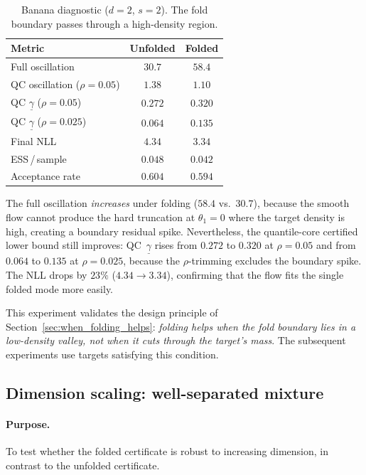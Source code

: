 \begin{table}[t]
\centering
\caption{Banana diagnostic ($d = 2$, $s = 2$).
  The fold boundary passes through a high-density region.}
\label{tab:banana}
\smallskip
\begin{tabular}{lcc}
\hline
Metric & Unfolded & Folded \\
\hline
Full oscillation & $30.7$ & $58.4$ \\
QC oscillation ($\rho = 0.05$) & $1.38$ & $1.10$ \\
QC $\underline{\gamma}$ ($\rho = 0.05$) & $0.272$ & $0.320$ \\
QC $\underline{\gamma}$ ($\rho = 0.025$) & $0.064$ & $0.135$ \\
Final NLL & $4.34$ & $3.34$ \\
ESS\,/\,sample & $0.048$ & $0.042$ \\
Acceptance rate & $0.604$ & $0.594$ \\
\hline
\end{tabular}
\end{table}

The full oscillation \emph{increases} under folding ($58.4$ vs.\
$30.7$), because the smooth flow cannot produce the hard truncation
at $\theta_1 = 0$ where the target density is high, creating a
boundary residual spike.  Nevertheless, the quantile-core
certified lower bound still improves: QC~$\underline{\gamma}$ rises
from $0.272$ to $0.320$ at $\rho = 0.05$ and from $0.064$ to $0.135$
at $\rho = 0.025$, because the $\rho$-trimming excludes the boundary
spike.  The NLL drops by $23\%$ ($4.34 \to 3.34$), confirming
that the flow fits the single folded mode more easily.

This experiment validates the design principle of
Section~\ref{sec:when_folding_helps}: \emph{folding helps when the
fold boundary lies in a low-density valley, not when it cuts through
the target's mass}.  The subsequent experiments use targets
satisfying this condition.


\subsection{Dimension scaling: well-separated mixture}
\label{sec:exp_dimension}

\paragraph{Purpose.}
To test whether the folded certificate is robust to increasing
dimension, in contrast to the unfolded certificate.


